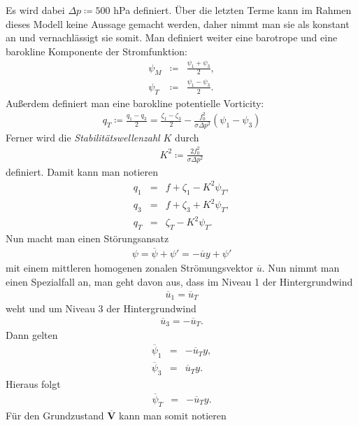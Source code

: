 \documentclass{book}
\newcommand\newoverline[1]{%
\overline{#1}}
\begin{document}
%
Es wird dabei $\Delta p \coloneqq500$ hPa definiert. Über die letzten Terme kann im Rahmen dieses Modell keine Aussage gemacht werden, daher nimmt man sie als konstant an und vernachlässigt sie somit. Man definiert weiter eine barotrope und eine barokline Komponente der Stromfunktion:
%
\begin{eqnarray}
\psi_M& \coloneqq&\frac{\psi_1 + \psi_3}{2},\\
\psi_T& \coloneqq&\frac{\psi_1 - \psi_3}{2}.
\end{eqnarray}
%
Außerdem definiert man eine barokline potentielle Vorticity:
%
\begin{eqnarray}
q_T \coloneqq\frac{q_1 - q_3}{2} = \frac{\zeta_1 - \zeta_3}{2} - \frac{f_0^2}{\sigma\Delta p^2}\left(\psi_1 - \psi_3\right)
\end{eqnarray}
%
Ferner wird die \textit{Stabilitätswellenzahl} $K$ durch
%
\begin{eqnarray}
K^2 \coloneqq\frac{2f_0^2}{\sigma\Delta p^2}
\end{eqnarray}
%
definiert. Damit kann man notieren
%
\begin{eqnarray}
q_1 & = & f + \zeta_1 - K^2\psi_T,\\
q_3 & = & f + \zeta_3 + K^2\psi_T,\\
q_T & = & \zeta_T - K^2\psi_T.
\end{eqnarray}
%
Nun macht man einen Störungsansatz
%
\begin{eqnarray}
\psi = \newoverline{\psi} + \psi' = -\newoverline{u}y + \psi'
\end{eqnarray}
%
mit einem mittleren homogenen zonalen Strömungsvektor $\newoverline{u}$. Nun nimmt man einen Spezialfall an, man geht davon aus, dass im Niveau 1 der Hintergrundwind
%
\begin{eqnarray}
\newoverline{u}_1 = \newoverline{u}_T
\end{eqnarray}
%
weht und um Niveau 3 der Hintergrundwind
%
\begin{eqnarray}
\newoverline{u}_3 = -\newoverline{u}_T.
\end{eqnarray}
%
Dann gelten
%
\begin{eqnarray}
\newoverline{\psi}_1 & = & -\newoverline{u}_Ty,\\
\newoverline{\psi}_3 & = & \newoverline{u}_Ty.
\end{eqnarray}
%
Hieraus folgt
%
\begin{eqnarray}
\newoverline{\psi}_T & = & -\newoverline{u}_Ty.
\end{eqnarray}
%
Für den Grundzustand $\newoverline{\mathbf{V}}$ kann man somit notieren
\end{document}

